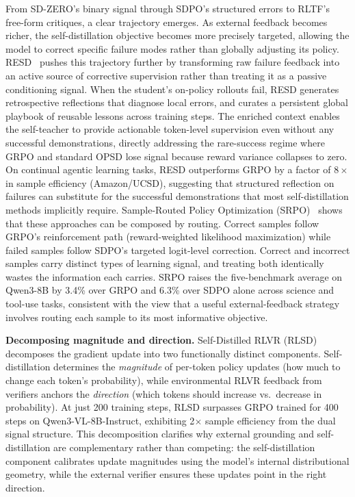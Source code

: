 \documentclass{article} %
\begin{document}
From SD-ZERO's binary signal through SDPO's structured errors to RLTF's free-form critiques, a clear trajectory emerges. As external feedback becomes richer, the self-distillation objective becomes more precisely targeted, allowing the model to correct specific failure modes rather than globally adjusting its policy. RESD~\citep{2605.12741} pushes this trajectory further by transforming raw failure feedback into an active source of corrective supervision rather than treating it as a passive conditioning signal. When the student's on-policy rollouts fail, RESD generates retrospective reflections that diagnose local errors, and curates a persistent global playbook of reusable lessons across training steps. The enriched context enables the self-teacher to provide actionable token-level supervision even without any successful demonstrations, directly addressing the rare-success regime where GRPO and standard OPSD lose signal because reward variance collapses to zero. On continual agentic learning tasks, RESD outperforms GRPO by a factor of $8\times$ in sample efficiency (Amazon/UCSD), suggesting that structured reflection on failures can substitute for the successful demonstrations that most self-distillation methods implicitly require. Sample-Routed Policy Optimization (SRPO)~\citep{2604.02288} shows that these approaches can be composed by routing. Correct samples follow GRPO's reinforcement path (reward-weighted likelihood maximization) while failed samples follow SDPO's targeted logit-level correction. Correct and incorrect samples carry distinct types of learning signal, and treating both identically wastes the information each carries. SRPO raises the five-benchmark average on Qwen3-8B by 3.4\% over GRPO and 6.3\% over SDPO alone across science and tool-use tasks, consistent with the view that a useful external-feedback strategy involves routing each sample to its most informative objective.

\textbf{Decomposing magnitude and direction.} Self-Distilled RLVR (RLSD)~\citep{2604.03128} decomposes the gradient update into two functionally distinct components. Self-distillation determines the \emph{magnitude} of per-token policy updates (how much to change each token's probability), while environmental RLVR feedback from verifiers anchors the \emph{direction} (which tokens should increase vs.\ decrease in probability). At just 200 training steps, RLSD surpasses GRPO trained for 400 steps on Qwen3-VL-8B-Instruct, exhibiting 2$\times$ sample efficiency from the dual signal structure. This decomposition clarifies why external grounding and self-distillation are complementary rather than competing: the self-distillation component calibrates update magnitudes using the model's internal distributional geometry, while the external verifier ensures these updates point in the right direction.
\end{document}

